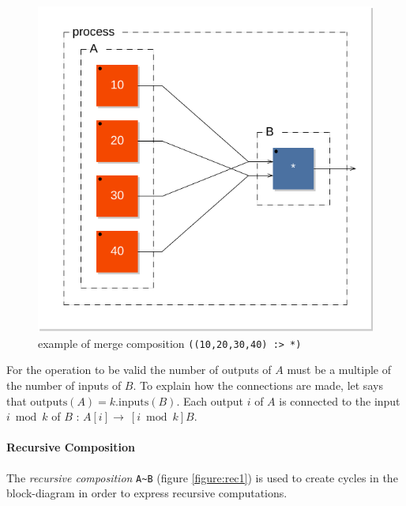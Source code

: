 \documentclass[a4paper,10pt]{book}
\begin{document}
\begin{figure}[h]
\centering 
\includegraphics[scale=0.7]{images/merge1} 
\caption{example of merge composition \lstinline'((10,20,30,40) :> *)'}  
\label{figure:merge1}
\end{figure}
 
For the operation to be valid the number of outputs of $A$ must be a multiple of the number of inputs of $B$. To explain how the connections are made, let says that $\mathrm{outputs}(A) = k.\mathrm{inputs}(B)$. Each output $i$ of $A$ is connected to the input $i \bmod k$ of $B$ : $A[i]\rightarrow\ [i \bmod k]B$.


\paragraph{Recursive Composition}
    The \emph{recursive composition} \lstinline'A~B' (figure \ref{figure:rec1}) is used to create cycles in the block-diagram in order to express recursive computations.
    
\end{document}

